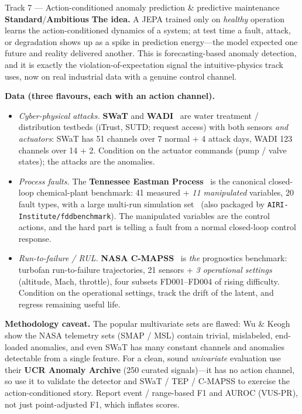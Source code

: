 \documentclass{article}
\newcommand{\code}[1]{\texttt{\small #1}}
\newcommand{\diffmed}{\colorbox{ebamber!18}{\textcolor{ebamber}{\small\bfseries Standard}}}
\newcommand{\diffhard}{\colorbox{ebred!15}{\textcolor{ebred}{\small\bfseries Ambitious}}}
\begin{document}
\begin{trackbox}{Track 7 --- Action-conditioned anomaly prediction \& predictive maintenance \hfill \diffmed{}/\diffhard{}}
\textbf{The idea.} A JEPA trained only on \emph{healthy} operation learns the
action-conditioned dynamics of a system; at test time a fault, attack, or
degradation shows up as a spike in prediction energy---the model expected one
future and reality delivered another. This is forecasting-based anomaly detection,
and it is exactly the violation-of-expectation signal the intuitive-physics track
uses, now on real industrial data with a genuine control channel.

\smallskip
\textbf{Data (three flavours, each with an action channel).}
\begin{itemize}[leftmargin=1.4em,itemsep=2pt,topsep=2pt]
  \item \emph{Cyber-physical attacks.} \textbf{SWaT} and \textbf{WADI}~\citep{SWaT,WADI}
    are water treatment / distribution testbeds (iTrust, SUTD; request access) with
    both sensors \emph{and actuators}: SWaT has 51 channels over 7 normal + 4 attack
    days, WADI 123 channels over 14 + 2. Condition on the actuator commands (pump /
    valve states); the attacks are the anomalies.
  \item \emph{Process faults.} The \textbf{Tennessee Eastman Process}~\citep{TEP} is
    the canonical closed-loop chemical-plant benchmark: 41 measured + \emph{11
    manipulated} variables, 20 fault types, with a large multi-run simulation
    set~\citep{riethTEP} (also packaged by \code{AIRI-Institute/fddbenchmark}). The
    manipulated variables are the control actions, and the hard part is telling a
    fault from a normal closed-loop control response.
  \item \emph{Run-to-failure / RUL.} \textbf{NASA C-MAPSS}~\citep{CMAPSS} is
    \emph{the} prognostics benchmark: turbofan run-to-failure trajectories, 21
    sensors + \emph{3 operational settings} (altitude, Mach, throttle), four subsets
    FD001--FD004 of rising difficulty. Condition on the operational settings, track
    the drift of the latent, and regress remaining useful life.
\end{itemize}

\smallskip
\textbf{Methodology caveat.} The popular multivariate sets are flawed: Wu \&
Keogh~\citep{UCRanomaly} show the NASA telemetry sets (SMAP / MSL) contain trivial,
mislabeled, end-loaded anomalies, and even SWaT has many constant channels and
anomalies detectable from a single feature. For a clean, sound \emph{univariate}
evaluation use their \textbf{UCR Anomaly Archive} (250 curated signals)---it has no
action channel, so use it to validate the detector and SWaT / TEP / C-MAPSS to
exercise the action-conditioned story. Report event / range-based F1 and AUROC
(VUS-PR), not just point-adjusted F1, which inflates scores.


\end{trackbox}
\end{document}
